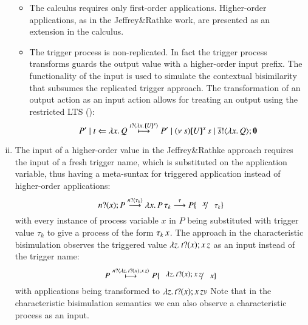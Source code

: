 \begin{enumerate}[i)]
\begin{itemize}
			\item	The \HOp calculus requires only first-order
				applications. Higher-order applications,
				as in the Jeffrey\&Rathke work,
				are presented as an extension in the \HOpp
				calculus.

			\item	The trigger process is non-replicated. In fact
				the trigger process transforms guards the output
				value with a higher-order input prefix. The
				functionality of the input is used to
				simulate the contextual bisimilarity that subsumes
				the replicated trigger approach.
				The transformation of an output action as an input
				action allows for treating an output
				using the restricted LTS ():
				\[
					P' \Par \htrigger{t}{\abs{x}{Q}} \hby{\bactinp{t}{\abs{x}{\mapchar{U}{x}}}}
					P' \Par \news{s}{ \appl{\mapchar{U}{x}}{s} \Par \bout{\dual{s}}{\abs{x}{Q}} \inact}
				\]
		\end{itemize}

	\item	The input of a higher-order value in the Jeffrey\&Rathke approach requires 
		the input of a fresh trigger name, which is substituted on the application
		variable, thus having a meta-suntax for triggered application instead
		of higher-order applications:
		\[
			\binp{n}{x} P \by{\bactinp{n}{\tau_k}} \appl{\abs{x}{P}}{\tau_k} \by{\tau} P \subst{x}{\tau_k} 
		\]
		with every instance of process variable $x$ in $P$ being substituted
		with trigger value $\tau_k$ to give a process of the form $\tau_k\,x$.
		The approach in the characteristic bisimulation observes the
		triggered value
		$\lambda z.\,t ? (x) ; x\,z$ as an input instead of the
		trigger name:
		\[
			P \hby{\bactinp{n}{\abs{z}\binp{t}{x} \appl{x}{z}}} P \subst{\abs{z}\binp{t}{x} \appl{x}{z}}{x}
		\]
		with applications being transformed to
		$\lambda z.\,t ? (x) ; x\,z{v}$
		Note that in the characteristic bisimulation semantics
		we can also observe a characteristic process as an input.
		

\end{enumerate}
